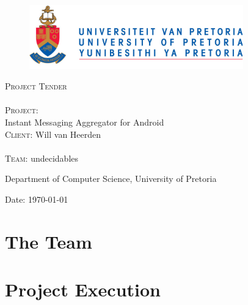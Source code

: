 \documentclass[12pt]{article}
\begin{document}
\begin{titlepage}
	\begin{center}
		
		\begin{figure}[t]
			\centering
			\includegraphics[width=350px]{UP_Logo.png}
		\end{figure}
		
		\textsc{\Huge Project Tender} \\ 

		\textsc{\huge \\Project:\\	}
		\huge Instant Messaging Aggregator for Android 
		\textsc{\Large \\Client:}
		\large Will van Heerden \\

		\textsc{\huge \\ Team:}
		\huge \textsc{}undecidables\textsc{}
		
		\small Department of Computer Science, University of Pretoria \\

	\vfill

	{\large Date: \today}		
		
		
	\end{center}
\end{titlepage}

\newpage
\tableofcontents

\pagebreak

\section{The Team}


\section{Project Execution}

\end{document}
